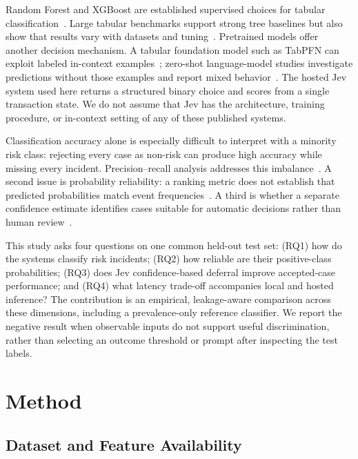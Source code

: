 \documentclass{llncs}
\begin{document}
Random Forest and XGBoost are established supervised choices for tabular classification~\cite{breiman2001forests,chen2016xgboost}. Large tabular benchmarks support strong tree baselines but also show that results vary with datasets and tuning~\cite{grinsztajn2022trees,mcelfresh2023tabzilla}. Pretrained models offer another decision mechanism. A tabular foundation model such as TabPFN can exploit labeled in-context examples~\cite{hollmann2025tabpfn}; zero-shot language-model studies investigate predictions without those examples and report mixed behavior~\cite{grushina2026llmtab,garnelo2026tabular}. The hosted Jev system used here returns a structured binary choice and scores from a single transaction state. We do not assume that Jev has the architecture, training procedure, or in-context setting of any of these published systems.

Classification accuracy alone is especially difficult to interpret with a minority risk class: rejecting every case as non-risk can produce high accuracy while missing every incident. Precision--recall analysis addresses this imbalance~\cite{davis2006pr}. A second issue is probability reliability: a ranking metric does not establish that predicted probabilities match event frequencies~\cite{guo2017calibration,haotian2023recal}. A third is whether a separate confidence estimate identifies cases suitable for automatic decisions rather than human review~\cite{singh2026abstention}.

This study asks four questions on one common held-out test set: (RQ1) how do the systems classify risk incidents; (RQ2) how reliable are their positive-class probabilities; (RQ3) does Jev confidence-based deferral improve accepted-case performance; and (RQ4) what latency trade-off accompanies local and hosted inference? The contribution is an empirical, leakage-aware comparison across these dimensions, including a prevalence-only reference classifier. We report the negative result when observable inputs do not support useful discrimination, rather than selecting an outcome threshold or prompt after inspecting the test labels.

\section{Method}

\subsection{Dataset and Feature Availability}
\end{document}
